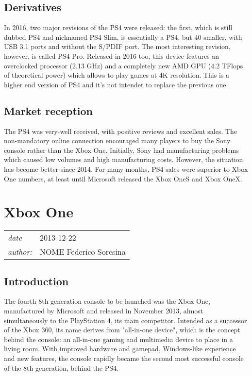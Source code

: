 \documentclass[a4paper,10pt]{book}
\newcommand{\pageHeader}[4]{
    \section{#1}
    \vspace{-0.3cm}
    \begin{table}[h!]
     \begin{tabular}{ll}
        \hline
        \textit{date} & #2 \\
        \textit{author: } & #3\\
        \hline
     \end{tabular}
    \end{table}
    \vspace{-0.3cm}
}
\begin{document}
 \subsection{ Derivatives  }
  In 2016, two major revisions of the PS4 were released: the first, which is still dubbed PS4 and nicknamed PS4 Slim, is essentially a PS4, but 40 smaller, with USB 3.1 ports and without the S/PDIF port.  
  The most interesting revision, however, is called PS4 Pro. Released in 2016 too, this device features an overclocked processor (2.13 GHz) and a completely new AMD GPU (4.2 TFlops of theoretical power) which allows to play games at 4K resolution. This is a higher end version of PS4 and it's not intendet to replace the previous one.  
 \subsection{ Market reception  }
  The PS4 was very-well received, with positive reviews and excellent sales. The non-mandatory online connection encouraged many players to buy the Sony console rather than the Xbox One.  
  Initially, Sony had manufacturing problems which caused low volumes and high manufacturing costs. However, the situation has become better since 2014. For many months, PS4 sales were superior to Xbox One numbers, at least until Microsoft released the Xbox OneS and Xbox OneX.  
 \newpage\pageHeader{Xbox One}{2013-12-22}{NOME Federico Soresina}{Xbox One description page}
 \subsection{ Introduction  }
  The fourth 8th generation console to be launched was the Xbox One, manufactured by Microsoft and released in November 2013, almost simultaneously to the PlayStation 4, its main competitor. Intended as a successor of the Xbox 360, its name derives from "all-in-one device", which is the concept behind the console: an all-in-one gaming and multimedia device to place in a living room. With improved hardware and gamepad, Windows-like experience and new features, the console rapidly became the second most successful console of the 8th generation, behind the PS4.  
\end{document}

